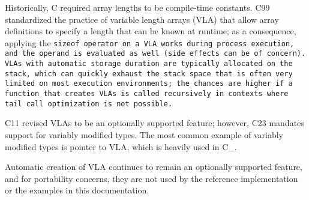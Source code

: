 Historically, C required array lengths to be compile-time constants.
C99 standardized the practice of variable length arrays (VLA) that allow array
definitions to specify a length that can be known at runtime; as a consequence,
applying the \tt{sizeof} operator on a VLA works during process execution,
and the operand is evaluated as well (side effects can be of concern).
VLAs with automatic storage duration are typically allocated on the stack,
which can quickly exhaust the stack space that is often very limited on most
execution environments; the chances are higher if a function that creates VLAs
is called recursively in contexts where tail call optimization is not possible.

C11 revised VLAs to be an optionally supported feature;
however, C23 mandates support for variably modified types.
The most common example of variably modified types
is pointer to VLA, which is heavily used in C\_.

\note Automatic creation of VLA continues to remain an optionally
supported feature, and for portability concerns, they are not used by
the reference implementation or the examples in this documentation.
